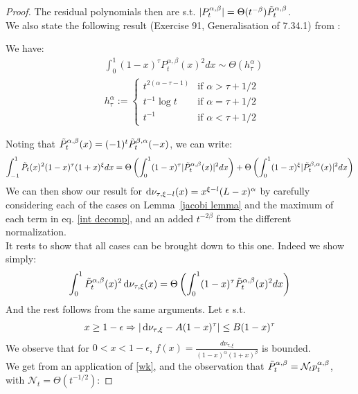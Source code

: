 \documentclass{article}
\begin{document}
\begin{proof}
The residual polynomials then are s.t. $|P^{\alpha,\beta}_t|=\Theta(t^{-\beta})\Tilde{P}^{\alpha,\beta}_t$.\\
We also state the following result (Exercise 91, Generalisation of 7.34.1) from \cite{szego1975orthogonal}:
\begin{lemma}
We have:
\begin{align}
    &\int_0^1(1-x)^\tau P_t^{\alpha,\beta}(x)^2dx \sim\Theta( h_{\tau}^\alpha) \\
    &h_{\tau}^\alpha:=
\left\{
	\begin{array}{ll}
		t^{2(\alpha-\tau-1)}  & \mbox{if } \alpha>\tau+1/2 \\
		t^{-1}\log t   & \mbox{if } \alpha=\tau+1/2 \\
		t^{-1}   & \mbox{if } \alpha<\tau+1/2
	\end{array}
\right.
\end{align}
 \label{jacobi lemma}
\end{lemma}
Noting that $\Tilde{P}^{\alpha,\beta}_t(x)=(-1)^t\Tilde{P}_t^{\beta,\alpha}(-x)$, we can write:
\begin{equation}
    \int_{-1}^1\Tilde{P}_t(x)^2(1-x)^\tau(1+x)^\xi dx = \Theta\left(\int_0^1(1-x)^\tau|\Tilde{P}_t^{\alpha,\beta}(x)|^2dx\right) +\Theta\left(\int_0^1(1-x)^\xi|\Tilde{P}_t^{\beta,\alpha}(x)|^2dx\right) \label{int decomp}
\end{equation}
We can then show our result for $\mathop{}\!\mathrm{d}\nu_{\tau,\xi-l}(x)=x^{\xi-l}(L-x)^\alpha$ by carefully considering each of the cases on Lemma~\ref{jacobi lemma} and the maximum of each term in eq. \ref{int decomp}, and an added $t^{-2\beta}$ from the different normalization. \\
It rests to show that all cases can be brought down to this one. Indeed we show simply:
\begin{equation}
    \int_0^1 \Tilde{P}_t^{\alpha,\beta}(x)^2\mathop{}\!\mathrm{d}\nu_{\tau,\xi}(x)= \Theta\left(\int_0^1(1-x)^\tau\Tilde{P}_t^{\alpha,\beta}(x)^2dx \right)
\end{equation}
And the rest follows from the same arguments. Let $\epsilon$ s.t.
\begin{equation}
    x\geq 1-\epsilon \Rightarrow |\mathop{}\!\mathrm{d}\nu_{\tau,\xi}-A(1-x)^\tau|\leq  B(1-x)^\tau \label{eq: epsilon}
\end{equation}
We observe that for $0<x<1-\epsilon$, $f(x)=\frac{d\nu_{\tau,\xi}}{(1-x)^\alpha(1+x)^\beta}$ is bounded. \\
We get from an application of \ref{wk}, and the observation that $\Tilde{P}_t^{\alpha,\beta}=\mathcal{N}_tp_t^{\alpha,\beta}$, with $\mathcal{N}_t=\Theta(t^{-1/2})$:

\end{proof}
\end{document}
